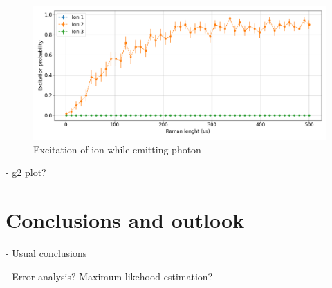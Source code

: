 \documentclass[english, a4paper, 12pt, twoside]{article}
\numberwithin{equation}{section} %
\begin{document}
\begin{figure}[H]
\centering
\includegraphics[width=\textwidth]{img/ramanlength_witherrors}
\caption{Excitation of ion while emitting photon}
\end{figure}

- g2 plot?
\section{Conclusions and outlook}
- Usual conclusions

\newpage




\newpage
\renewcommand{\appendixpagename}{Appendix} %
\renewcommand{\appendixtocname}{Appendix} %
\appendixpage
\addappheadtotoc


\begin{appendices}
- Error analysis? Maximum likehood estimation?
\end{appendices}
\end{document}
